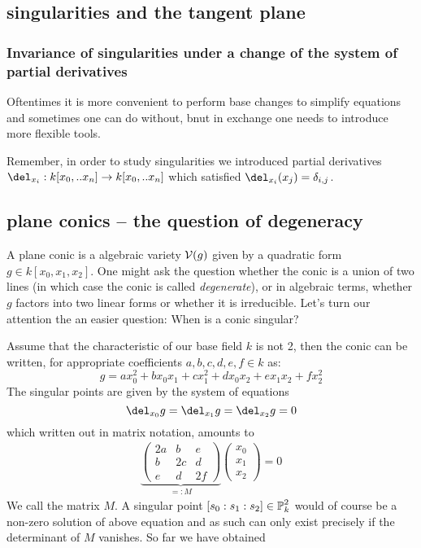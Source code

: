 \subsection{singularities and the tangent plane}



\subsubsection{Invariance of singularities under a change of the system of partial derivatives}

Oftentimes it is more convenient to perform base changes to simplify equations and sometimes one can do without, bnut in exchange one needs to introduce more flexible tools.

Remember, in order to study singularities we introduced partial derivatives $\del_{x_i} : k[x_0,..x_n] \to k[x_0,..x_n]$ which satisfied $\del_{x_i}(x_j) = \delta_{i,j}$.



\subsection{plane conics -- the question of degeneracy}

A plane conic is a algebraic variety $\operatorname{\mathcal V}(g)$ given by a quadratic form $g \in k[x_0,x_1,x_2]$. One might ask the question whether the conic is a union of two lines (in which case the conic is called \emph{degenerate}), or in algebraic terms, whether $g$ factors into two linear forms or whether it is irreducible.
Let's turn our attention the an easier question: When is a conic singular?

Assume that the characteristic of our base field $k$ is not 2, then the conic can be written, for appropriate coefficients $a,b,c,d,e,f \in k$ as:
\begin{equation}
g = ax_0^2 + bx_0x_1 + cx_1^2 + dx_0x_2 + ex_1x_2 + fx_2^2
\end{equation}
The singular points are given by the system of equations
\begin{equation}
\del_{x_0} g = \del_{x_1} g = \del_{x_2} g = 0
\end{equation}
which written out in matrix notation, amounts to
\begin{align}
\underset{=:M}{\underbrace{
\begin{pmatrix}
2a & b & e \\
b & 2c & d \\
e & d & 2f
\end{pmatrix}
}}
\begin{pmatrix}
x_0 \\ x_1 \\ x_2
\end{pmatrix}
=
0
\end{align}
We call the matrix $M$.
A singular point $[s_0:s_1:s_2] \in \operatorname{\mathbb P}^2_k$ would of course be a non-zero solution of above equation and as such can only exist precisely if the determinant of $M$ vanishes.
So far we have obtained

